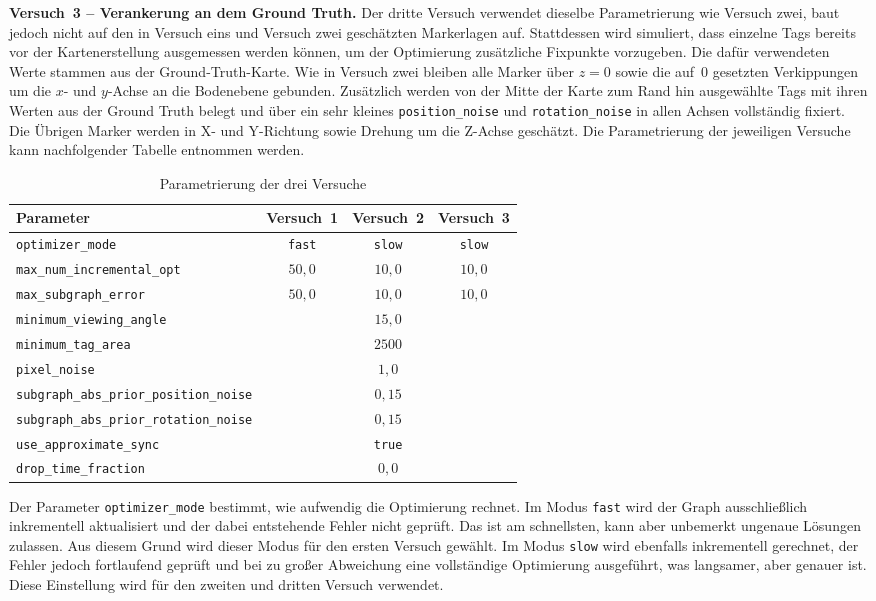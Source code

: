 \textbf{Versuch~3 -- Verankerung an dem Ground Truth.}
Der dritte Versuch verwendet dieselbe Parametrierung wie Versuch zwei, baut jedoch nicht auf den in Versuch eins und Versuch zwei geschätzten Markerlagen auf.
Stattdessen wird simuliert, dass einzelne Tags bereits vor der Kartenerstellung ausgemessen werden können, um der Optimierung zusätzliche Fixpunkte vorzugeben.
Die dafür verwendeten Werte stammen aus der Ground-Truth-Karte.
Wie in Versuch zwei bleiben alle Marker über $z=0$ sowie die auf~$0$ gesetzten Verkippungen um die $x$- und $y$-Achse an die Bodenebene gebunden.
Zusätzlich werden von der Mitte der Karte zum Rand hin ausgewählte Tags mit ihren Werten aus der Ground Truth belegt und über ein sehr kleines \texttt{position\_noise} und \texttt{rotation\_noise} in allen Achsen vollständig fixiert.
Die Übrigen Marker werden in X- und Y-Richtung sowie Drehung um die Z-Achse geschätzt.
Die Parametrierung der jeweiligen Versuche kann nachfolgender Tabelle entnommen werden.
\begin{table}[htbp]
\centering
\begin{tabular}{lccc}
\toprule
\textbf{Parameter} & \textbf{Versuch~1} & \textbf{Versuch~2} & \textbf{Versuch~3} \\
\midrule
\texttt{optimizer\_mode}            & \texttt{fast} & \texttt{slow} & \texttt{slow} \\
\texttt{max\_num\_incremental\_opt} & $50{,}0$          & $10{,}0$          & $10{,}0$ \\
\texttt{max\_subgraph\_error}       & $50{,}0$      & $10{,}0$      & $10{,}0$ \\
\midrule
\texttt{minimum\_viewing\_angle}                & \multicolumn{3}{c}{$15{,}0$} \\
\texttt{minimum\_tag\_area}                     & \multicolumn{3}{c}{$2500$} \\
\texttt{pixel\_noise}                           & \multicolumn{3}{c}{$1{,}0$} \\
\texttt{subgraph\_abs\_prior\_position\_noise}  & \multicolumn{3}{c}{$0{,}15$} \\
\texttt{subgraph\_abs\_prior\_rotation\_noise}  & \multicolumn{3}{c}{$0{,}15$} \\
\texttt{use\_approximate\_sync}                 & \multicolumn{3}{c}{\texttt{true}} \\
\texttt{drop\_time\_fraction}                   & \multicolumn{3}{c}{$0{,}0$} \\
\bottomrule
\end{tabular}
\caption{Parametrierung der drei Versuche}
\label{tab:tagslam_params_laeufe}
\end{table}
\FloatBarrier
Der Parameter \texttt{optimizer\_mode} bestimmt, wie aufwendig die Optimierung rechnet.
Im Modus \texttt{fast} wird der Graph ausschließlich inkrementell aktualisiert und der dabei entstehende Fehler nicht geprüft.
Das ist am schnellsten, kann aber unbemerkt ungenaue Lösungen zulassen.
Aus diesem Grund wird dieser Modus für den ersten Versuch gewählt.
Im Modus \texttt{slow} wird ebenfalls inkrementell gerechnet, der Fehler jedoch fortlaufend geprüft und bei zu großer Abweichung eine vollständige 
Optimierung ausgeführt, was langsamer, aber genauer ist.
Diese Einstellung wird für den zweiten und dritten Versuch verwendet.

